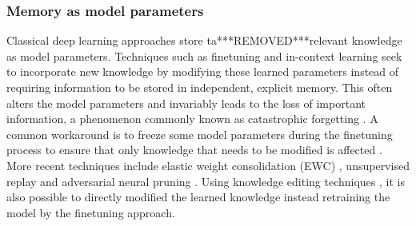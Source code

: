\documentclass[10pt,journal,compsoc]{IEEEtran}
\begin{document}
	\subsubsection{Memory as model parameters}
	Classical deep learning approaches store ta***REMOVED***relevant knowledge as model parameters. Techniques such as finetuning and in-context learning seek to incorporate new knowledge by modifying these learned parameters instead of requiring information to be stored in independent, explicit memory. This often alters the model parameters and invariably leads to the loss of important information, a phenomenon commonly known as catastrophic forgetting \cite{goodfellow2013empirical}. A common workaround is to freeze some model parameters during the finetuning process to ensure that only knowledge that needs to be modified is affected \cite{ziegler2019fine,aghajanyan2020better}. More recent techniques include elastic weight consolidation (EWC) \cite{kirkpatrick2017overcoming}, unsupervised replay \cite{tadros2022sleep} and adversarial neural pruning \cite{figueroa2024evaluating}. Using knowledge editing techniques \cite{wang2024deepedit,zhong2023mquake,zhang2024comprehensive}, it is also possible to directly modified the learned knowledge instead retraining the model by the finetuning approach. 
	
\end{document}
